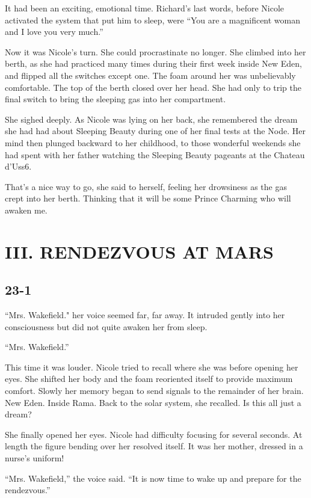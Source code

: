 \documentclass[]{article}
\begin{document}
{It had been an exciting, emotional time.  Richard’s last words, before Nicole activated the system that put him to sleep, were “You are a magnificent woman and I love you very much.”

Now it was Nicole’s turn.  She could procrastinate no longer.  She climbed into her berth, as she had practiced many times during their first week inside New Eden, and flipped all the switches except one.  The foam around her was unbelievably comfortable.  The top of the berth closed over her head.  She had only to trip the final switch to bring the sleeping gas into her compartment.

She sighed deeply.  As Nicole was lying on her back, she remembered the dream she had had about Sleeping Beauty during one of her final tests at the Node.  Her mind then plunged backward to her childhood, to those wonderful weekends she had spent with her father watching the Sleeping Beauty pageants at the Chateau d’Uss6.

That’s a nice way to go, she said to herself, feeling her drowsiness as the gas crept into her berth.  Thinking that it will be some Prince Charming who will awaken me.


\newpage

\section{III.  RENDEZVOUS AT MARS}

\subsection*{23-1}

“Mrs.  Wakefield."  her voice seemed far, far away.  It intruded gently into her consciousness but did not quite awaken her from sleep.

“Mrs.  Wakefield.”

This time it was louder.  Nicole tried to recall where she was before opening her eyes.  She shifted her body and the foam reoriented itself to provide maximum comfort.  Slowly her memory began to send signals to the remainder of her brain.  New Eden.  Inside Rama.  Back to the solar system, she recalled.  Is this all just a dream?

She finally opened her eyes.  Nicole had difficulty focusing for several seconds.  At length the figure bending over her resolved itself.  It was her mother, dressed in a nurse’s uniform!

“Mrs.  Wakefield,” the voice said.  “It is now time to wake up and prepare for the rendezvous.”

}
\end{document}
